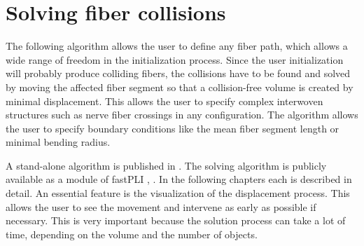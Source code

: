 \section{Solving fiber collisions}
\label{sec:Solver}
%
The following algorithm allows the user to define any fiber path, which allows a wide range of freedom in the initialization process.
Since the user initialization will probably produce colliding fibers, the collisions have to be found and solved by moving the affected fiber segment so that a collision-free volume is created by minimal displacement.
This allows the user to specify complex interwoven structures such as nerve fiber crossings in any configuration.
The algorithm allows the user to specify boundary conditions like the mean fiber segment length or minimal bending radius.
\par
% 
A stand-alone algorithm is published in \cite{Matuschke2019}.
The solving algorithm is publicly available as a module of \ac{fastPLI} \cite{Matuschke2021}, .
In the following chapters each \dummy{} is described in detail.
% 
An essential feature is the visualization of the displacement process.
This allows the user to see the movement and intervene as early as possible if necessary.
This is very important because the solution process can take a lot of time, depending on the volume and the number of objects.
%
%
% 
